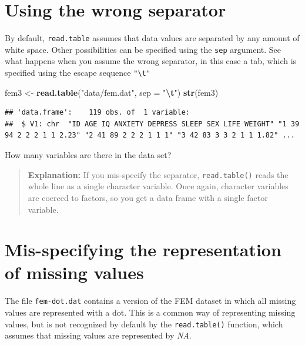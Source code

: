 \documentclass[
]{book}
\newenvironment{Shaded}{\begin{snugshade}}{\end{snugshade}}
\newcommand{\AttributeTok}[1]{\textcolor[rgb]{0.13,0.29,0.53}{#1}}
\newcommand{\FunctionTok}[1]{\textcolor[rgb]{0.13,0.29,0.53}{\textbf{#1}}}
\newcommand{\NormalTok}[1]{#1}
\newcommand{\OtherTok}[1]{\textcolor[rgb]{0.56,0.35,0.01}{#1}}
\newcommand{\SpecialCharTok}[1]{\textcolor[rgb]{0.81,0.36,0.00}{\textbf{#1}}}
\newcommand{\StringTok}[1]{\textcolor[rgb]{0.31,0.60,0.02}{#1}}
\begin{document}
\section{Using the wrong separator}\label{using-the-wrong-separator}

By default, \texttt{read.table} assumes that data values are separated
by any amount of white space. Other possibilities can be specified
using the \texttt{sep} argument. See what happens when you assume the
wrong separator, in this case a tab, which is specified using the
escape sequence \texttt{"\textbackslash{}t"}

\begin{Shaded}
\begin{Highlighting}[]
\NormalTok{fem3 }\OtherTok{\textless{}{-}} \FunctionTok{read.table}\NormalTok{(}\StringTok{"data/fem.dat"}\NormalTok{, }\AttributeTok{sep =} \StringTok{"}\SpecialCharTok{\textbackslash{}t}\StringTok{"}\NormalTok{)}
\FunctionTok{str}\NormalTok{(fem3)}
\end{Highlighting}
\end{Shaded}

\begin{verbatim}
## 'data.frame':    119 obs. of  1 variable:
##  $ V1: chr  "ID AGE IQ ANXIETY DEPRESS SLEEP SEX LIFE WEIGHT" "1 39 94 2 2 2 1 1 2.23" "2 41 89 2 2 2 1 1 1" "3 42 83 3 3 2 1 1 1.82" ...
\end{verbatim}

How many variables are there in the data set?

\begin{quote}
\textbf{Explanation:} If you mis-specify the separator,
\texttt{read.table()} reads the whole line as a single character
variable. Once again, character variables are coerced to factors, so
you get a data frame with a single factor variable.
\end{quote}

\section{Mis-specifying the representation of missing values}\label{mis-specifying-the-representation-of-missing-values}

The file \texttt{fem-dot.dat} contains a version of the FEM dataset in
which all missing values are represented with a dot. This is a common
way of representing missing values, but is not recognized by default
by the \texttt{read.table()} function, which assumes that missing values
are represented by \emph{NA}.
\end{document}
